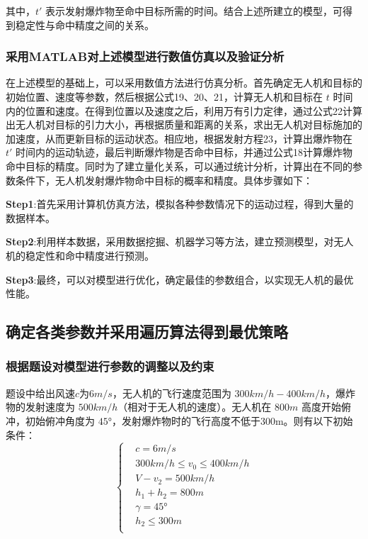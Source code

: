 \documentclass[normalsize]{ctexart}
\begin{document}
		其中，$t'$ 表示发射爆炸物至命中目标所需的时间。结合上述所建立的模型，可得到稳定性与命中精度之间的关系。
		
		\subsubsection{采用MATLAB对上述模型进行数值仿真以及验证分析}
	
		在上述模型的基础上，可以采用数值方法进行仿真分析。首先确定无人机和目标的初始位置、速度等参数，然后根据公式19、20、21，计算无人机和目标在 $t$ 时间内的位置和速度。在得到位置以及速度之后，利用万有引力定律，通过公式22计算出无人机对目标的引力大小，再根据质量和距离的关系，求出无人机对目标施加的加速度，从而更新目标的运动状态。相应地，根据发射方程23，计算出爆炸物在 $t'$ 时间内的运动轨迹，最后判断爆炸物是否命中目标，并通过公式18计算爆炸物命中目标的精度。同时为了建立量化关系，可以通过统计分析，计算出在不同的参数条件下，无人机发射爆炸物命中目标的概率和精度。具体步骤如下：
		\par \textbf{Step1}:首先采用计算机仿真方法，模拟各种参数情况下的运动过程，得到大量的数据样本。
		\par \textbf{Step2}:利用样本数据，采用数据挖掘、机器学习等方法，建立预测模型，对无人机的稳定性和命中精度进行预测。
		\par \textbf{Step3}:最终，可以对模型进行优化，确定最佳的参数组合，以实现无人机的最优性能。
		\subsection{确定各类参数并采用遍历算法得到最优策略}
		\subsubsection{根据题设对模型进行参数的调整以及约束}
		题设中给出风速$c$为$6m/s$，无人机的飞行速度范围为 $300 km/h -400 km/h$，爆炸物的发射速度为 $500km/h$（相对于无人机的速度）。无人机在 $800m$ 高度开始俯冲，初始俯冲角度为 $45°$，发射爆炸物时的飞行高度不低于300m。则有以下初始条件：
		\begin{equation}
			\begin{cases}
				&c=6m/s\\
				&300km/h\leq v_0 \le 400km/h\\
				&V-v_2=500km/h\\
				&h_1+h_2=800m\\
				&\gamma=45°\\
				&h_2\leq300m\\
			\end{cases}
		\end{equation}
\end{document}
